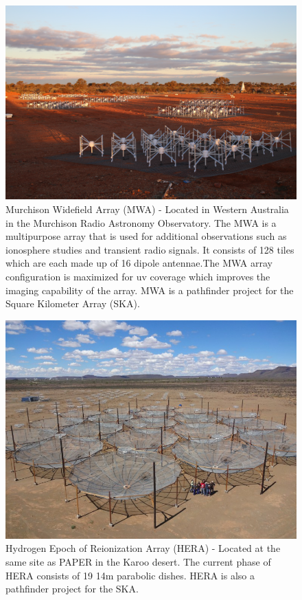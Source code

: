 \documentclass[a0,landscape]{a0poster}
\begin{document}
\begin{multicols}{4}
\begin{figure}[H]
\centering
\label{fig:MWA}
\includegraphics[width=0.6\linewidth]{figures/phaseII_tiles.jpg}
\caption{Murchison Widefield Array (MWA) - Located in Western Australia in the Murchison Radio Astronomy Observatory. The MWA is a multipurpose array that is used for additional observations such as ionosphere studies and transient radio signals. It consists of 128 tiles which are each made up of 16 dipole antennae.The MWA array configuration is maximized for uv coverage which improves the imaging capability of the array. MWA is a pathfinder project for the Square Kilometer Array (SKA).}
\end{figure}

\begin{figure}[H]
\centering
\label{fig:HERA}
\includegraphics[width=0.6\linewidth]{figures/HERA19.png}
\caption{Hydrogen Epoch of Reionization Array (HERA) - Located at the same site as PAPER in the Karoo desert. The current phase of HERA consists of 19 14m parabolic dishes. HERA is also a pathfinder project for the SKA.}
\end{figure}




\end{multicols}
\end{document}

